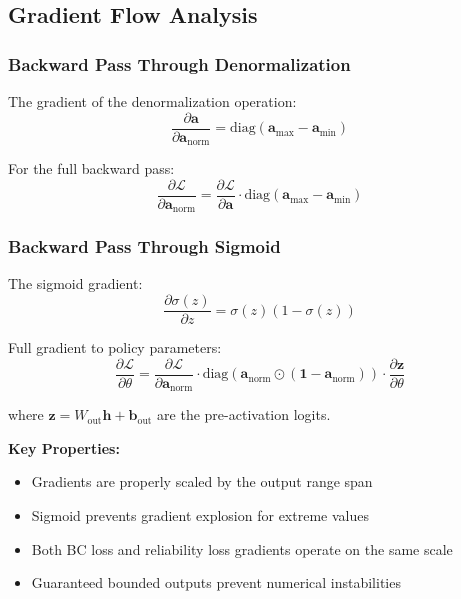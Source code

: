 \documentclass[11pt,a4paper]{article}
\begin{document}
\subsection{Gradient Flow Analysis}

\subsubsection{Backward Pass Through Denormalization}

The gradient of the denormalization operation:
\begin{equation}
\frac{\partial \mathbf{a}}{\partial \mathbf{a}_{\text{norm}}} = \text{diag}(\mathbf{a}_{\max} - \mathbf{a}_{\min})
\end{equation}

For the full backward pass:
\begin{equation}
\frac{\partial \mathcal{L}}{\partial \mathbf{a}_{\text{norm}}} = \frac{\partial \mathcal{L}}{\partial \mathbf{a}} \cdot \text{diag}(\mathbf{a}_{\max} - \mathbf{a}_{\min})
\end{equation}

\subsubsection{Backward Pass Through Sigmoid}

The sigmoid gradient:
\begin{equation}
\frac{\partial \sigma(z)}{\partial z} = \sigma(z)(1 - \sigma(z))
\end{equation}

Full gradient to policy parameters:
\begin{equation}
\frac{\partial \mathcal{L}}{\partial \theta} = \frac{\partial \mathcal{L}}{\partial \mathbf{a}_{\text{norm}}} \cdot \text{diag}(\mathbf{a}_{\text{norm}} \odot (\mathbf{1} - \mathbf{a}_{\text{norm}})) \cdot \frac{\partial \mathbf{z}}{\partial \theta}
\end{equation}

where $\mathbf{z} = W_{\text{out}} \mathbf{h} + \mathbf{b}_{\text{out}}$ are the pre-activation logits.

\textbf{Key Properties:}
\begin{itemize}
    \item Gradients are properly scaled by the output range span
    \item Sigmoid prevents gradient explosion for extreme values
    \item Both BC loss and reliability loss gradients operate on the same scale
    \item Guaranteed bounded outputs prevent numerical instabilities
\end{itemize}
\end{document}
